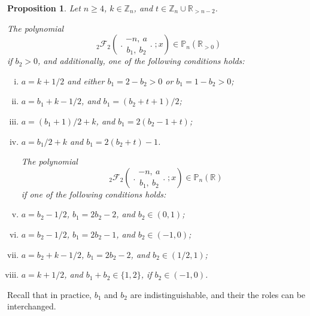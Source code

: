 \documentclass[reqno,11pt]{amsart}
\newtheorem{proposition}[theorem]{Proposition}
\theoremstyle{remark}
\renewcommand{\P}{\mathbb{P}}
\newcommand{\R}{\mathbb{R}}
\newcommand{\Z}{\mathbb{Z}}
\newcommand{\rr}{\mathbb{R}}
\newcommand*\pFq[5]{%
 {\ }_{#1}{\mathcal F}_{#2}{\left(\genfrac..{0pt}{}{#3}{#4};#5\right)}%
}
\begin{document}
\begin{proposition}
\label{Prop:410new}
Let $n\ge 4$, $k \in \Z_n$, and $t\in \Z_n \cup\rr_{>n-2}$.

The polynomial
\begin{equation*}
    \pFq{2}{2}{-n,\ a}{b_1,\ b_2}{x} \in \P_n(\R_{>0})
\end{equation*}
if $b_2>0$, and additionally, one of the following conditions holds:
\begin{enumerate}[(i)]
  \item \label{Prop:410new1}
   $ a=  k + 1/2$ and
   either $b_1=2-b_2>0$ or $b_1=1-b_2>0$;

 \item \label{Prop:410new2} 
    $ a= b_1 + k -1/2$, and 
$b_1 = (b_2+t+1)/2$;

 \item \label{Prop:410new3}
   $ a= (b_1+1)/2+k  $, and $b_1 =2(b_2-1+t)$;

\item \label{Prop:410new4}
   $ a= b_1 /2+k$ and $b_1 =2(b_2+t)-1$.

\vspace{.2cm}

\hspace{-1.3cm} The polynomial  
\begin{equation*}
    \pFq{2}{2}{-n,\ a}{b_1,\ b_2}{x} \in \P_n(\R)
\end{equation*}
if one of the following conditions holds:

\vspace{.2cm}

    \item \label{Prop:410new5} 
    $ a= b_2  -1/2 $,   
$b_1 = 2b_2 -2$, and $b_2\in (0,1)$;

   \item \label{Prop:410new6}
   $ a=  b_2-1/2$, $b_1=2b_2-1$, and $b_2\in (-1,0)$;
   
  \item \label{Prop:410new7} 
    $ a= b_2 + k -1/2 $,  
$b_1 = 2b_2 -2$, and $b_2\in (1/2,1)$;

 \item \label{Prop:410new8}
   $ a=  k +1/2  $, and   $b_1  + b_2\in \{1,2\}$, if   $b_2\in (-1,0) $.
\end{enumerate}    
\end{proposition}
Recall that in practice, $b_1$ and $b_2$ are indistinguishable, and their the roles can be interchanged.  
\end{document}
